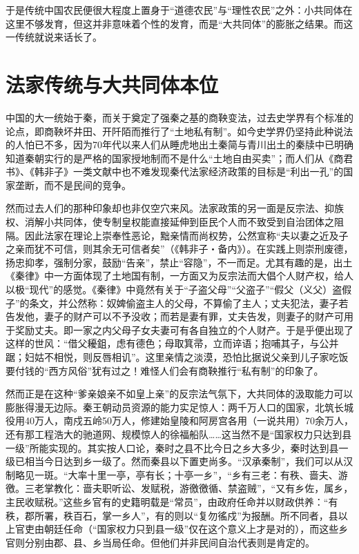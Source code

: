 \documentclass[a4paper,12pt,punct=kaiming]{ctexart}
\begin{document}
于是传统中国农民便很大程度上置身于“道德农民”与“理性农民”之外：小共同体在这里不够发育，但这并非意味着个性的发育，而是“大共同体”的膨胀之结果。而这一传统就说来话长了。

\section*{法家传统与大共同体本位}

中国的大一统始于秦，而关于奠定了强秦之基的商鞅变法，过去史学界有个标准的论点，即商鞅坏井田、开阡陌而推行了“土地私有制”。如今史学界仍坚持此种说法的人怕已不多，因为70年代以来人们从睡虎地出土秦简与青川出土的秦牍中已明确知道秦朝实行的是严格的国家授地制而不是什么“土地自由买卖”；而人们从《商君书》、《韩非子》一类文献中也不难发现秦代法家经济政策的目标是“利出一孔”的国家垄断，而不是民间的竞争。

然而过去人们的那种印象却也非仅空穴来风。法家政策的另一面是反宗法、抑族权、消解小共同体，使专制皇权能直接延伸到臣民个人而不致受到自治团体之阻隔。因此法家在理论上崇奉性恶论，黜亲情而尚权势，公然宣称“夫以妻之近及子之亲而犹不可信，则其余无可信者矣”（《韩非子・备内》）。在实践上则崇刑废德，扬忠抑孝，强制分家，鼓励“告亲”，禁止“容隐”，不一而足。尤其有趣的是，出土《秦律》中一方面体现了土地国有制，一方面又为反宗法而大倡个人财产权，给人以极“现代”的感觉。《秦律》中竟然有关于“子盗父母”“父盗子”“假父（义父）盗假子”的条文，并公然称：奴婢偷盗主人的父母，不算偷了主人；丈夫犯法，妻子若告发他，妻子的财产可以不予没收；而若是妻有罪，丈夫告发，则妻子的财产可用于奖励丈夫。即一家之内父母子女夫妻可有各自独立的个人财产。于是乎便出现了这样的世风：“借父耰鉏，虑有德色；母取箕帚，立而谇语；抱哺其子，与公并踞；妇姑不相悦，则反唇相讥”。这里亲情之淡漠，恐怕比据说父亲到儿子家吃饭要付钱的“西方风俗”犹有过之！难怪人们会有商鞅推行“私有制”的印象了。

然而正是在这种“爹亲娘亲不如皇上亲”的反宗法气氛下，大共同体的汲取能力可以膨胀得漫无边际。秦王朝动员资源的能力实足惊人：两千万人口的国家，北筑长城役用40万人，南戍五岭50万人，修建始皇陵和阿房宫各用（一说共用）70余万人，还有那工程浩大的驰道网、规模惊人的徐福船队……这当然不是“国家权力只达到县一级”所能实现的。其实按人口论，秦时之县不比今日之乡大多少，秦时达到县一级已相当今日达到乡一级了。然而秦县以下置吏尚多。“汉承秦制”，我们可以从汉制略见一斑。“大率十里一亭，亭有长；十亭一乡”，“乡有三老：有秩、啬夫、游徼。三老掌教化：啬夫职听讼、发赋税，游徼徼循、禁盗贼”，“又有乡佐，属乡，主民收赋税。”这些乡官有的史籍明载是“常员”，由政府任命并以财政供养：“有秩，郡所署，秩百石，掌一乡人”，有的则以“复勿徭戍”为报酬。所不同者，县以上官吏由朝廷任命（“国家权力只到县一级”仅在这个意义上才是对的），而这些乡官则分别由郡、县、乡当局任命。但他们并非民间自治代表则是肯定的。
\end{document}
